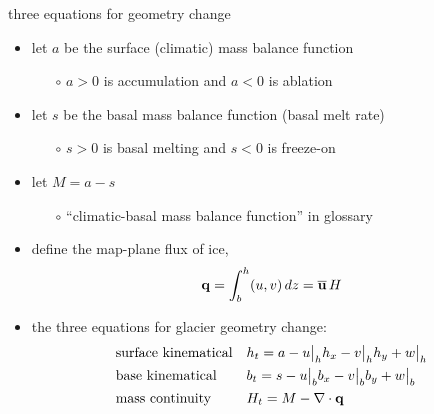 \begin{frame}{three equations for geometry change}

\begin{itemize}
\item let $a$ be the surface (climatic) mass balance function
    \begin{itemize}
    \item[$\circ$] $a>0$ is accumulation and $a<0$ is ablation
    \end{itemize}
\item let $s$ be the basal mass balance function (basal melt rate)
    \begin{itemize}
    \item[$\circ$] $s>0$ is basal melting and $s<0$ is freeze-on
    \end{itemize}
\item let $M=a-s$
    \begin{itemize}
    \item[$\circ$] ``climatic-basal mass balance function'' in glossary
    \end{itemize}
\item define the map-plane flux of ice,
	$$\mathbf{q} = \int_{b}^{h} (u,v)\,dz = \overline{\mathbf{u}}\,H$$
\item the three equations for glacier geometry change:
\begin{align*}
&\text{surface kinematical} && h_t = a - u\big|_h h_x - v\big|_h h_y + w\big|_h  \\
&\text{base kinematical} && b_t = s - u\big|_b b_x - v\big|_b b_y + w\big|_b  \\
&\text{mass continuity} && H_t = M - \nabla\cdot \mathbf{q}
\end{align*}
\end{itemize}
\end{frame}


